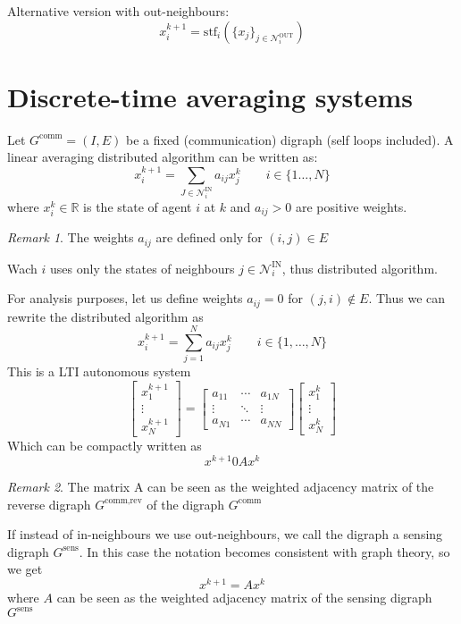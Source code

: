 \documentclass{book}
\newcommand{\R}{\mathbb{R}}
\theoremstyle{theoremv2}
\theoremstyle{defv2}
\theoremstyle{remark}
\newtheorem*{remark}{Remark}
\theoremstyle{remark}
\theoremstyle{definition}
\theoremstyle{definition}
\begin{document}
Alternative version with out-neighbours:
\[
    x_i^{k+1}=\text{stf}_i(\{x_j\}_{j\in\mathcal{N}_i^{\text{OUT}}})
\]
\section{Discrete-time averaging systems}
Let $G^{\text{comm}}=(I,E)$ be a fixed (communication) digraph (self loops included). A linear averaging distributed algorithm can be written as:
\[
    x_i^{k+1}=\displaystyle\sum_{J\in\mathcal{N}_i^{\text{IN}}}a_{ij}x_j^k \qquad i\in\{1\dots,N\}
\]
where $x_i^k\in\R$ is the state of agent $i$ at $k$ and $a_{ij}>0$ are positive weights. 
\begin{remark}
    The weights $a_{ij}$ are defined only for $(i,j)\in E$
\end{remark}
Wach $i$ uses only the states of neighbours $j\in\mathcal{N}_i^{\text{IN}}$, thus distributed algorithm.

For analysis purposes, let us define weights $a_{ij}=0$ for $(j,i)\notin E$. Thus we can rewrite the distributed algorithm as 
\[
    x_i^{k+1}=\displaystyle\sum_{j=1}^{N}a_{ij}x_j^k \qquad i\in\{1,\dots,N\}
\]
This is a LTI autonomous system 
\[
    \begin{bmatrix}
        x_1^{k+1}\\ \vdots \\ x_N^{k+1}
    \end{bmatrix} = \begin{bmatrix}
        a_{11} & \cdots & a_{1N} \\ 
        \vdots & \ddots & \vdots \\
        a_{N1} & \cdots & a_{NN}
    \end{bmatrix} \begin{bmatrix}
        x_1^k \\ \vdots \\ x_N^k
    \end{bmatrix}
\]
Which can be compactly written as  
\[
    x^{k+1} 0 Ax^k
\]
\begin{remark}
    The matrix A can be seen as the weighted adjacency matrix of the reverse digraph $G^{\text{comm,rev}}$ of the digraph $G^{\text{comm}}$
\end{remark}
If instead of in-neighbours we use out-neighbours, we call the digraph a sensing digraph $G^{\text{sens}}$. In this case the notation becomes consistent with graph theory, so we get 
\[
    x^{k+1} = A x^k
\]
where $A$ can be seen as the weighted adjacency matrix of the sensing digraph $G^{\text{sens}}$
\end{document}
